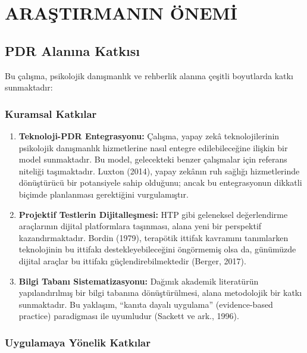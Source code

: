 
\chapter{ARAŞTIRMANIN ÖNEMİ}

\section{PDR Alanına Katkısı}

Bu çalışma, psikolojik danışmanlık ve rehberlik alanına çeşitli boyutlarda katkı sunmaktadır:

\subsection{Kuramsal Katkılar}

\begin{enumerate}
  \item \textbf{Teknoloji-PDR Entegrasyonu:} Çalışma, yapay zekâ teknolojilerinin psikolojik danışmanlık hizmetlerine nasıl entegre edilebileceğine ilişkin bir model sunmaktadır. Bu model, gelecekteki benzer çalışmalar için referans niteliği taşımaktadır. Luxton (2014), yapay zekânın ruh sağlığı hizmetlerinde dönüştürücü bir potansiyele sahip olduğunu; ancak bu entegrasyonun dikkatli biçimde planlanması gerektiğini vurgulamıştır.

  \item \textbf{Projektif Testlerin Dijitalleşmesi:} HTP gibi geleneksel değerlendirme araçlarının dijital platformlara taşınması, alana yeni bir perspektif kazandırmaktadır. Bordin (1979), terapötik ittifak kavramını tanımlarken teknolojinin bu ittifakı destekleyebileceğini öngörmemiş olsa da, günümüzde dijital araçlar bu ittifakı güçlendirebilmektedir (Berger, 2017).

  \item \textbf{Bilgi Tabanı Sistematizasyonu:} Dağınık akademik literatürün yapılandırılmış bir bilgi tabanına dönüştürülmesi, alana metodolojik bir katkı sunmaktadır. Bu yaklaşım, ``kanıta dayalı uygulama'' (evidence-based practice) paradigması ile uyumludur (Sackett ve ark., 1996).
\end{enumerate}

\subsection{Uygulamaya Yönelik Katkılar}

